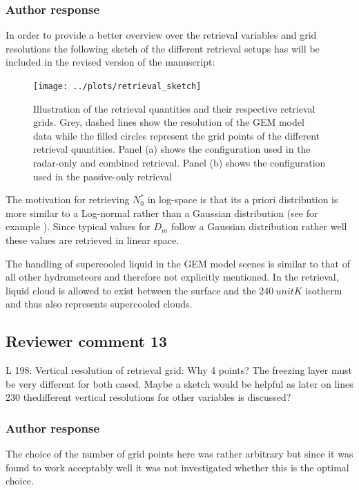 \documentclass[11pt]{scrartcl}
\begin{document}
\subsubsection*{Author response}

In order to provide a better overview over the retrieval variables and
grid resolutions the following sketch of the different retrieval setups has
will be included in the revised version of the manuscript:

\begin{figure}
\centering
\texttt{[image: ../plots/retrieval\_sketch]}
\caption{Illustration of the retrieval quantities and their respective retrieval
  grids. Grey, dashed lines show the resolution of the GEM model data while the
  filled circles represent the grid points of the different retrieval
  quantities. Panel (a) shows the configuration used in the radar-only and
  combined retrieval. Panel (b) shows the configuration used in the passive-only
  retrieval}
\label{fig:retrieval_sketch}
\end{figure}

The motivation for retrieving $N_0^*$ in log-space is that its a priori
distribution is more similar to a Log-normal rather than a Gaussian distribution
(see for example \citet{delanoe14}). Since typical values for $D_m$ follow a
Gaussian distribution rather well these values are retrieved in linear space.

The handling of supercooled liquid in the GEM model scenes is similar to that
of all other hydrometeors and therefore not explicitly mentioned. In the retrieval,
liquid cloud is allowed to exist between the surface and the $240\ unit{K}$ isotherm
and thus also represents supercooled clouds.


\subsection*{Reviewer comment 13}

L 198:  Vertical resolution of retrieval grid:  Why 4 points?  The freezing layer must be very different for both cased. Maybe a sketch would be helpful as later on lines 230 thedifferent vertical resolutions for other variables is discussed?

\subsubsection*{Author response}

The choice of the number of grid points here was rather arbitrary but since it
was found to work acceptably well it was not investigated whether this is the
optimal choice.
\end{document}
